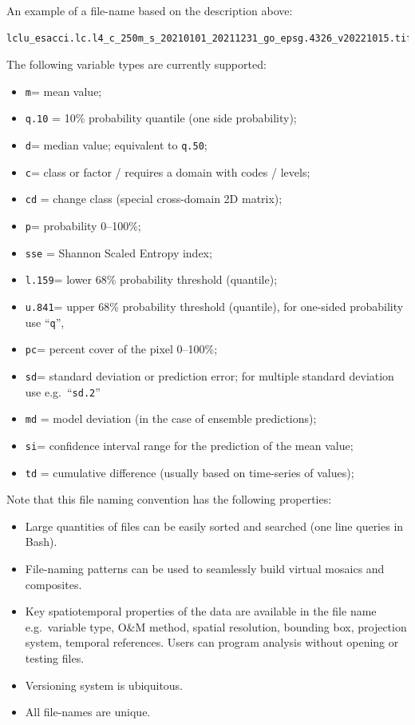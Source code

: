 \documentclass[
  graybox,natbib,nospthms]{svmono}
\providecommand{\tightlist}{%
  \setlength{\itemsep}{0pt}\setlength{\parskip}{0pt}}
\providecommand{\tightlist}{\setlength{\itemsep}{0pt}\setlength{\parskip}{0pt}}
\begin{document}
An example of a file-name based on the description above:

\begin{verbatim}
lclu_esacci.lc.l4_c_250m_s_20210101_20211231_go_epsg.4326_v20221015.tif
\end{verbatim}

The following variable types are currently supported:

\begin{itemize}
\tightlist
\item
  \texttt{m}= mean value;
\item
  \texttt{q.10} = 10\% probability quantile (one side probability);
\item
  \texttt{d}= median value; equivalent to \texttt{q.50};
\item
  \texttt{c}= class or factor / requires a domain with codes / levels;
\item
  \texttt{cd} = change class (special cross-domain 2D matrix);
\item
  \texttt{p}= probability 0--100\%;
\item
  \texttt{sse} = Shannon Scaled Entropy index;
\item
  \texttt{l.159}= lower 68\% probability threshold (quantile);
\item
  \texttt{u.841}= upper 68\% probability threshold (quantile), for one-sided probability use ``\texttt{q}'',
\item
  \texttt{pc}= percent cover of the pixel 0--100\%;
\item
  \texttt{sd}= standard deviation or prediction error; for multiple standard deviation use e.g.~``\texttt{sd.2}''
\item
  \texttt{md} = model deviation (in the case of ensemble predictions);
\item
  \texttt{si}= confidence interval range for the prediction of the mean value;
\item
  \texttt{td} = cumulative difference (usually based on time-series of values);
\end{itemize}

Note that this file naming convention has the following properties:

\begin{itemize}
\tightlist
\item
  Large quantities of files can be easily sorted and searched (one line queries in Bash).
\item
  File-naming patterns can be used to seamlessly build virtual mosaics and composites.\\
\item
  Key spatiotemporal properties of the data are available in the file name e.g.~variable type, O\&M method, spatial resolution, bounding box, projection system, temporal references. Users can program analysis without opening or testing files.
\item
  Versioning system is ubiquitous.
\item
  All file-names are unique.
\end{itemize}
\end{document}
